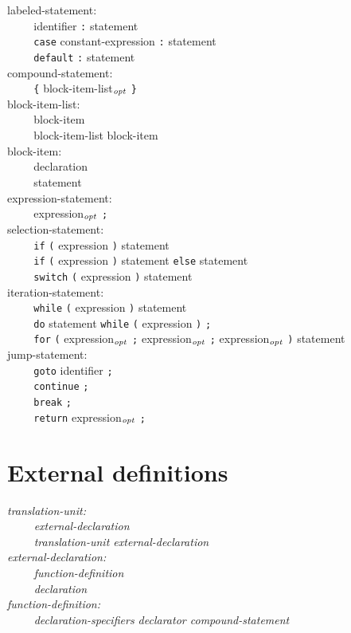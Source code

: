 \documentclass[12pt]{report}
\def\|{\verb|}
\newcommand\opt{$_{{\it opt}}$ }
\begin{document}
\noindent
labeled-statement:\\
\|    | identifier \verb+:+ statement\\
\|    | \verb+case+ constant-expression \verb+:+ statement\\
\|    | \verb+default+ \verb+:+ statement\\

\noindent
compound-statement:\\
\|    | \verb+{+ block-item-list\opt \verb+}+\\

\noindent
block-item-list:\\
\|    | block-item\\
\|    | block-item-list block-item\\

\noindent
block-item:\\
\|    | declaration\\
\|    | statement\\

\noindent
expression-statement:\\
\|    | expression\opt \verb+;+\\

\noindent
selection-statement:\\
\|    | \verb+if+ \verb+(+ expression \verb+)+ statement\\
\|    | \verb+if+ \verb+(+ expression \verb+)+ statement \verb+else+ statement\\
\|    | \verb+switch+ \verb+(+ expression \verb+)+ statement\\

\noindent
iteration-statement:\\
\|    | \verb+while+ \verb+(+ expression \verb+)+ statement\\
\|    | \verb+do+ statement \verb+while+ \verb+(+ expression \verb+)+ \verb+;+\\
\|    | \verb+for+ \verb+(+ expression\opt \verb+;+ expression\opt \verb+;+ expression\opt \verb+)+ statement\\

\noindent
jump-statement:\\
\|    | \verb+goto+ identifier \verb+;+\\
\|    | \verb+continue+ \verb+;+\\
\|    | \verb+break+ \verb+;+\\
\|    | \verb+return+ expression\opt \verb+;+\\

\rm
\section{External definitions}
\it
\noindent
translation-unit:\\
\|    | external-declaration\\
\|    | translation-unit external-declaration\\

\noindent
external-declaration:\\
\|    | function-definition\\
\|    | declaration\\

\noindent
function-definition:\\
\|    | declaration-specifiers declarator compound-statement\\
\end{document}
